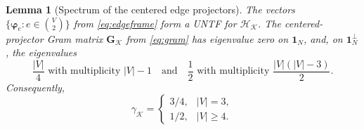 \documentclass[a4paper]{amsart}
\numberwithin{equation}{section}
\newtheorem{lemma}[theorem]{Lemma}
\begin{document}
\begin{lemma}[Spectrum of the centered edge projectors]\label{edgeframespectrum}
    The vectors $\{\bm\varphi_e : e\in\binom{V}{2}\}$ from \eqref{eq:edgeframe} form a UNTF for $\mathcal H_{\mathcal K}$.
    The centered-projector Gram matrix $\bm G_{\mathcal K}$ from \eqref{eq:gram} has eigenvalue zero on $\bm 1_N$, and, on $\bm 1_N^\perp$, the eigenvalues
    \begin{equation*}
        \frac {|V|}4 \text{ with multiplicity }|V|-1
        \quad\text{and}\quad
        \frac12 \text{ with multiplicity }\frac{|V|(|V|-3)}2.
    \end{equation*}
    Consequently,
    \begin{equation*}
        \gamma_{\mathcal K}
        =\begin{cases}
            3/4,&|V|=3,\\
            1/2,&|V|\ge4.
        \end{cases}
    \end{equation*}
\end{lemma}
\end{document}
